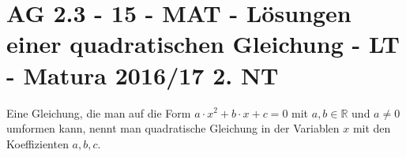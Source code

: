\section{AG 2.3 - 15 - MAT - Lösungen einer quadratischen Gleichung - LT - Matura 2016/17 2. NT}

\begin{beispiel}[AG 2.3]{1} %
Eine Gleichung, die man auf die Form $a\cdot x^2+b\cdot x+c=0$ mit $a,b\in\mathbb{R}$ und $a\neq 0$ umformen kann, nennt man quadratische Gleichung in der Variablen $x$ mit den Koeffizienten $a,b,c$.

\end{beispiel}